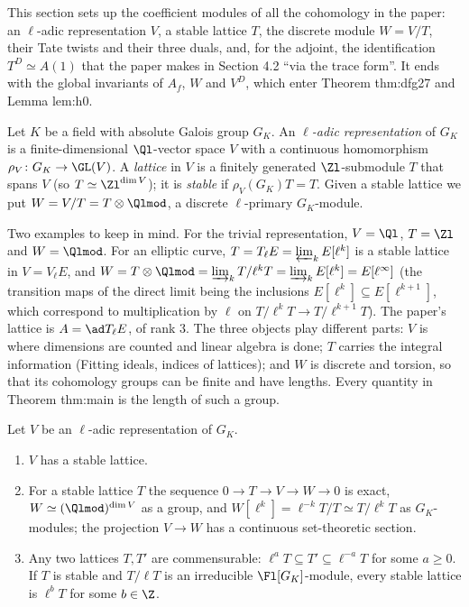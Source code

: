 This section sets up the coefficient modules of all the cohomology in the paper: an $\ell$-adic representation $V$, a stable lattice
$T$, the discrete module $W=V/T$, their Tate twists and their three duals, and, for the adjoint, the identification $T^D\simeq A(1)$ that the
paper makes in Section 4.2 ``via the trace form''. It ends with the global invariants of $A_f$, $W$ and $V^D$, which enter Theorem
thm:dfg27 and Lemma lem:h0.

\begin{definition}\label{def:blochkato:l-adic-rep}
Let $K$ be a field with absolute Galois group $G_K$. An \emph{$\ell$-adic representation} of $G_K$ is a finite-dimensional $\Ql$-vector space $V$
with a continuous homomorphism $\rho_V\colon G_K\to\GL(V)$. A \emph{lattice} in $V$ is a finitely generated $\Zl$-submodule $T$ that spans $V$
(so $T\simeq\Zl^{\dim V}$); it is \emph{stable} if $\rho_V(G_K)T=T$. Given a stable lattice we put $W=V/T=T\otimes\Qlmod$, a discrete
$\ell$-primary $G_K$-module.
\end{definition}

Two examples to keep in mind. For the trivial representation, $V=\Ql$, $T=\Zl$ and $W=\Qlmod$. For an elliptic curve, $T=T_\ell E=\varprojlim_kE[\ell^k]$ is a stable
lattice in $V=V_\ell E$, and $W=T\otimes\Qlmod=\varinjlim_kT/\ell^kT=\varinjlim_kE[\ell^k]=E[\ell^\infty]$ (the transition maps of the direct limit being the inclusions
$E[\ell^k]\subseteq E[\ell^{k+1}]$, which correspond to multiplication by $\ell$ on $T/\ell^kT\to T/\ell^{k+1}T$). The paper's lattice is $A=\ad T_\ell E$, of rank $3$. The three
objects play different parts: $V$ is where dimensions are counted and linear algebra is done; $T$ carries the integral information (Fitting ideals, indices of
lattices); and $W$ is discrete and torsion, so that its cohomology groups can be finite and have lengths. Every quantity in Theorem thm:main is the length of such a
group.

\begin{proposition}[lattices]\label{prop:blochkato:lattices}
Let $V$ be an $\ell$-adic representation of $G_K$.
\begin{enumerate}[label=(\roman*)]
\item $V$ has a stable lattice.
\item For a stable lattice $T$ the sequence $0\to T\to V\to W\to0$ is exact, $W\simeq(\Qlmod)^{\dim V}$ as a group, and $W[\ell^k]=\ell^{-k}T/T\simeq T/\ell^kT$ as
$G_K$-modules; the projection $V\to W$ has a continuous set-theoretic section.
\item Any two lattices $T,T'$ are commensurable: $\ell^aT\subseteq T'\subseteq\ell^{-a}T$ for some $a\ge0$. If $T$ is stable and $T/\ell T$ is an
irreducible $\Fl[G_K]$-module, every stable lattice is $\ell^bT$ for some $b\in\Z$.
\end{enumerate}
\end{proposition}

